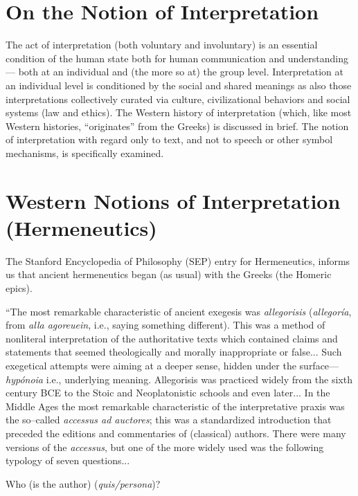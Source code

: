 \section*{On the Notion of Interpretation}

The act of interpretation (both voluntary and involuntary) is an essential condition of the human state both for human communication and understanding — both at an individual and (the more so at) the group level. Interpretation at an individual level is conditioned by the social and shared meanings as also those interpretations collectively curated via culture, civilizational behaviors and social systems (law and ethics). The Western history of interpretation (which, like most Western histories, “originates” from the Greeks) is discussed in brief. The notion of interpretation with regard only to text, and not to speech or other symbol mechanisms, is specifically examined.


\section*{Western Notions of Interpretation (Hermeneutics)}

The Stanford Encyclopedia of Philosophy (SEP) entry for Hermeneutics, informs us that ancient hermeneutics began (as usual) with the Greeks (the Homeric epics).

\begin{myquote}
“The most remarkable characteristic of ancient exegesis was \textit{allegorisis} (\textit{allegoría}, from \textit{alla agoreuein}, i.e., saying something different). This was a method of nonliteral interpretation of the authoritative texts which contained claims and statements that seemed theologically and morally inappropriate or false... Such exegetical attempts were aiming at a deeper sense, hidden under the surface—\textit{hypónoia} i.e., underlying meaning. Allegorisis was practiced widely from the sixth century BCE to the Stoic and Neoplatonistic schools and even later... In the Middle Ages the most remarkable characteristic of the interpretative praxis was the so–called \textit{accessus ad auctores}; this was a standardized introduction that preceded the editions and commentaries of (classical) authors. There were many versions of the \textit{accessus}, but one of the more widely used was the following typology of seven questions...
\end{myquote}

\item Who (is the author) (\textit{quis/persona})?

